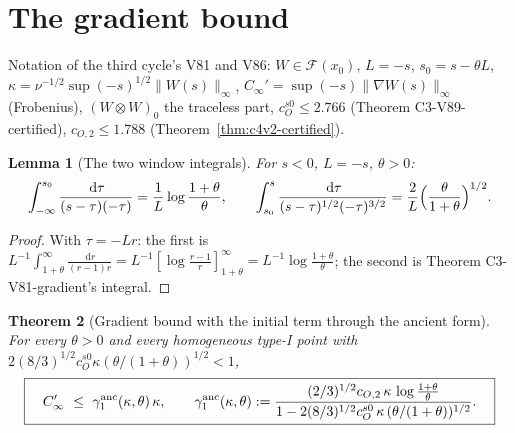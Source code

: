 \documentclass[11pt]{article}
\newcommand{\dd}{\,\mathrm d}
\theoremstyle{plain}
\newtheorem{theorem}{Theorem}[section]
\newtheorem{lemma}[theorem]{Lemma}
\theoremstyle{definition}
\theoremstyle{remark}
\begin{document}
\section{The gradient bound}
\label{sec:c4v3-gradient}

Notation of the third cycle's V81 and V86: \(W\in\mathcal F(x_0)\), \(L=-s\),
\(s_0=s-\theta L\), \(\kappa=\nu^{-1/2}\sup(-s)^{1/2}\|W(s)\|_\infty\), \(C_\infty'=\sup(-s)\|\nabla W(s)\|_\infty\) (Frobenius),
\((W\otimes W)_0\) the traceless part, \(c_O^{s0}\le2.766\) (Theorem C3-V89-certified),
\(c_{O,2}\le1.788\) (Theorem~\ref{thm:c4v2-certified}).

\begin{lemma}[The two window integrals]
\label{lem:c4v3-integrals}
For \(s<0\), \(L=-s\), \(\theta>0\):
\begin{equation}
 \int_{-\infty}^{s_0}\frac{\dd\tau}{(s-\tau)(-\tau)}=\frac1L\log\frac{1+\theta}\theta,\qquad
 \int_{s_0}^s\frac{\dd\tau}{(s-\tau)^{1/2}(-\tau)^{3/2}}=\frac2L\Bigl(\frac\theta{1+\theta}\Bigr)^{1/2} .
 \label{eq:c4v3-integrals}
\end{equation}
\end{lemma}

\begin{proof}
With \(\tau=-Lr\): the first is \(L^{-1}\int_{1+\theta}^\infty\frac{\dd r}{(r-1)r}=L^{-1}[\log\frac{r-1}r]_{1+\theta}^\infty=L^{-1}\log\frac{1+\theta}\theta\);
the second is Theorem C3-V81-gradient's integral.
\end{proof}

\begin{theorem}[Gradient bound with the initial term through the ancient form]
\label{thm:c4v3-gradient}
For every \(\theta>0\) and every homogeneous type-I point with
\(2(8/3)^{1/2}c_O^{s0}\kappa(\theta/(1+\theta))^{1/2}<1\),
\begin{equation}
 \boxed{\quad
 C_\infty'\ \le\ \gamma_1^{\rm anc}(\kappa,\theta)\,\kappa,\qquad
 \gamma_1^{\rm anc}(\kappa,\theta):=\frac{(2/3)^{1/2}c_{O,2}\,\kappa\,\log\frac{1+\theta}\theta}{1-2(8/3)^{1/2}c_O^{s0}\,\kappa\,(\theta/(1+\theta))^{1/2}} .
 \quad}
 \label{eq:c4v3-gamma1}
\end{equation}
\end{theorem}
\end{document}
